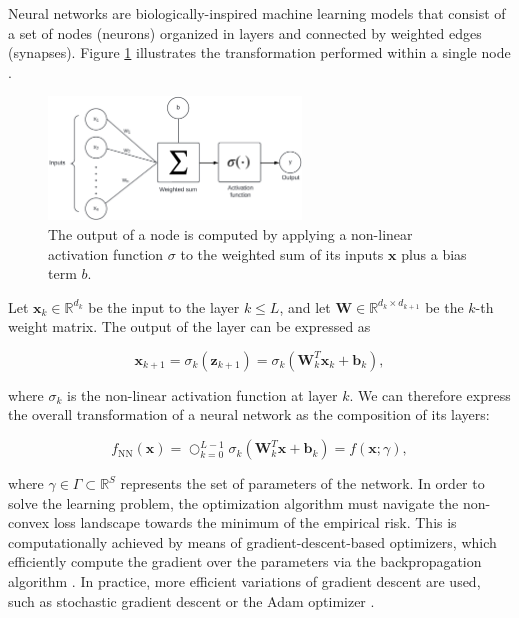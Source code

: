 Neural networks are biologically-inspired machine learning models that consist of a set of 
nodes (neurons) organized in layers and connected by weighted edges
(synapses). Figure \ref{fig:nn_node} illustrates the transformation
performed within a single node
\cite{simonyanVeryDeepConvolutional2015,n.vapnikNatureStatisticalLearning2000,voulodimosDeepLearningComputer2018}. 

\begin{figure}[H]
    \centering
    \includegraphics[width=0.6\textwidth]{img/theoretical_background/nn_unit.png}
    \caption{The output of a node is computed by applying a non-linear
    activation function $\sigma$ to the weighted sum of its inputs $\bm{x}$ plus
    a bias term $b$.}
    \label{fig:nn_node}
\end{figure}

Let $\bm{x}_k \in \mathbb{R}^{d_k}$ be the input to the layer $k \leq L$, and 
let $\bm{W} \in \mathbb{R}^{d_k \times d_{k+1}}$ be the $k$-th weight matrix. 
The output of the layer can be expressed as

$$
\bm{x}_{k+1} = \sigma_k(\bm{z}_{k+1}) = \sigma_k(\bm{W}_k^T \bm{x}_k + \bm{b}_k),
$$

where $\sigma_k$ is the non-linear activation function at layer $k$. We 
can therefore express the overall transformation of a neural network
as the composition of its layers:

$$
f_{\text{NN}}(\bm{x}) = \bigcirc_{k=0}^{L-1} \sigma_k(\bm{W}_k^T \bm{x} + \bm{b}_k) = f(\bm{x}; \gamma),
$$

where $\gamma \in \Gamma \subset \mathbb{R}^S$ represents the set of parameters of the network. In order to solve the learning problem, the optimization algorithm must navigate the non-convex loss
landscape towards the minimum of the empirical risk. This is computationally achieved 
by means of gradient-descent-based optimizers, which efficiently compute the
gradient over the parameters via the backpropagation algorithm 
\cite{rumelhartLearningRepresentationsBackpropagating1986}. In practice, more efficient
variations of gradient descent are used, such as stochastic gradient descent 
\cite{ruderOverviewGradientDescent2017} 
or the Adam optimizer 
\cite{kingmaAdamMethodStochastic2017}. \\


